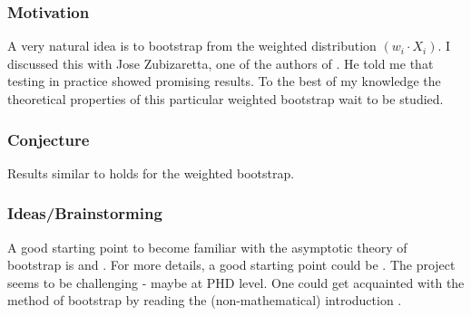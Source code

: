 \subsubsection{Motivation}
A very natural idea is to bootstrap from the weighted distribution
$
(w_i\cdot X_i)
$.
I discussed this with Jose Zubizaretta, one of the authors of \cite{Wang2019, Wang2023}.
He told me that testing in practice showed promising results.
To the best of my knowledge the theoretical properties of this particular weighted bootstrap wait to be studied.
\subsubsection{Conjecture}
Results similar to \cite[Theorem~23.5]{Vaart2000} holds for the weighted bootstrap.
\subsubsection{Ideas/Brainstorming}
A good starting point to become familiar with the asymptotic theory of bootstrap is \cite[§3.6]{vaart2013} and \cite[§23]{Vaart2000}.
For more details, a good starting point could be \cite{Barbe1995}.
The project seems to be challenging - maybe at PHD level.
One could get acquainted with the method of bootstrap by reading the (non-mathematical) introduction \cite{Efron1994}.
